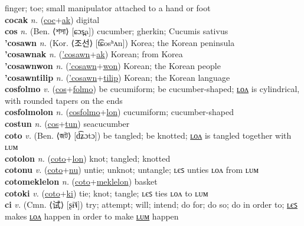 finger; toe; small manipulator attached to a hand or foot \label{coc} \\
\textbf{cocak} \textit{n.} (\hyperref[coc]{coc}+\hyperref[ak]{ak})
digital \label{cocak} \\
\textbf{cos} \textit{n.} (Ben. ⟨শসা⟩ [ɕɔs̪a])
cucumber; gherkin; Cucumis sativus \label{cos} \\
\textbf{'cosawn} \textit{n.} (Kor. ⟨조선⟩ [t͡ɕosʰʌn])
Korea; the Korean peninsula \label{'cosawn} \\
\textbf{'cosawnak} \textit{n.} (\hyperref['cosawn]{'cosawn}+\hyperref[ak]{ak})
Korean; from Korea \label{'cosawnak} \\
\textbf{'cosawnwon} \textit{n.} (\hyperref['cosawn]{'cosawn}+\hyperref[won]{won})
Korean; the Korean people \label{'cosawnwon} \\
\textbf{'cosawntilip} \textit{n.} (\hyperref['cosawn]{'cosawn}+\hyperref[tilip]{tilip})
Korean; the Korean language \label{'cosawntilip} \\
\textbf{cosfolmo} \textit{v.} (\hyperref[cos]{cos}+\hyperref[folmo]{folmo})
be cucumiform; be cucumber-shaped; \hyperref[cosfolmolon]{ʟᴏᴧ} is cylindrical, with rounded tapers on the ends \label{cosfolmo} \\
\textbf{cosfolmolon} \textit{n.} (\hyperref[cosfolmo]{cosfolmo}+\hyperref[lon]{lon})
cucumiform; cucumber-shaped \label{cosfolmolon} \\
\textbf{costun} \textit{n.} (\hyperref[cos]{cos}+\hyperref[tun]{tun})
seacucumber \label{costun} \\
\textbf{coto} \textit{v.} (Ben. ⟨জট⟩ [d͡ʑɔtɔ])
be tangled; be knotted; \hyperref[cotolon]{ʟᴏᴧ} is tangled together with ʟᴜᴍ \label{coto} \\
\textbf{cotolon} \textit{n.} (\hyperref[coto]{coto}+\hyperref[lon]{lon})
knot; tangled; knotted \label{cotolon} \\
\textbf{cotonu} \textit{v.} (\hyperref[coto]{coto}+\hyperref[nu]{nu})
untie; unknot; untangle; ʟєꜱ unties ʟᴏᴧ from ʟᴜᴍ \label{cotonu} \\
\textbf{cotomeklelon} \textit{n.} (\hyperref[coto]{coto}+\hyperref[meklelon]{meklelon})
basket \label{cotomeklelon} \\
\textbf{cotoki} \textit{v.} (\hyperref[coto]{coto}+\hyperref[ki]{ki})
tie; knot; tangle; ʟєꜱ ties ʟᴏᴧ to ʟᴜᴍ \label{cotoki} \\
\textbf{ci} \textit{v.} (Cmn. ⟨试⟩ [ʂɨ˥˩])
try; attempt; will; intend; do for; do so; do in order to; \hyperref[ciles]{ʟєꜱ} makes \hyperref[cilon]{ʟᴏᴧ} happen in order to make \hyperref[cilum]{ʟᴜᴍ} happen \label{ci} \\
